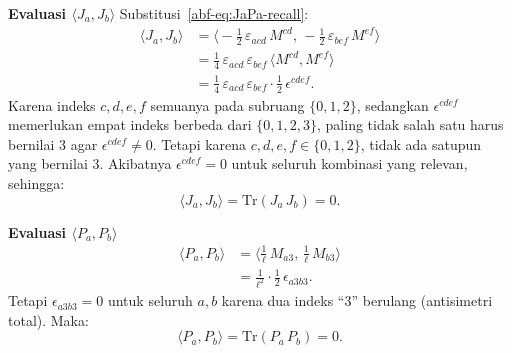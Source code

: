 \vspace{0.5em}
\noindent \textbf{Evaluasi $\langle J_a, J_b\rangle$}
Substitusi~\eqref{abf-eq:JaPa-recall}:
\begin{align}
    \langle J_a, J_b\rangle
    &= \big\langle -\tfrac{1}{2}\,\varepsilon_{acd}\,M^{cd},\, -\tfrac{1}{2}\,\varepsilon_{bef}\,M^{ef}\big\rangle \nonumber\\[4pt]
    &= \tfrac{1}{4}\,\varepsilon_{acd}\,\varepsilon_{bef}\,\langle M^{cd}, M^{ef}\rangle \nonumber\\[4pt]
    &= \tfrac{1}{4}\,\varepsilon_{acd}\,\varepsilon_{bef}\cdot \tfrac{1}{2}\,\epsilon^{cdef}.
\end{align}
Karena indeks $c, d, e, f$ semuanya pada subruang $\{0, 1, 2\}$, sedangkan $\epsilon^{cdef}$ memerlukan empat indeks berbeda dari $\{0, 1, 2, 3\}$, paling tidak salah satu harus bernilai 3 agar $\epsilon^{cdef} \neq 0$. Tetapi karena $c, d, e, f \in \{0, 1, 2\}$, tidak ada satupun yang bernilai 3. Akibatnya $\epsilon^{cdef} = 0$ untuk seluruh kombinasi yang relevan, sehingga:
\begin{equation}\label{abf-eq:JJ-zero}
    \langle J_a, J_b\rangle = \mathrm{Tr}(J_a\,J_b) = 0.
\end{equation}

\vspace{0.5em}
\noindent \textbf{Evaluasi $\langle P_a, P_b\rangle$}
\begin{align}
    \langle P_a, P_b\rangle
    &= \big\langle \tfrac{1}{\ell}\,M_{a3},\, \tfrac{1}{\ell}\,M_{b3}\big\rangle \nonumber\\[4pt]
    &= \tfrac{1}{\ell^2}\cdot \tfrac{1}{2}\,\epsilon_{a3b3}.
\end{align}
Tetapi $\epsilon_{a3b3} = 0$ untuk seluruh $a, b$ karena dua indeks ``3'' berulang (antisimetri total). Maka:
\begin{equation}\label{abf-eq:PP-zero}
    \langle P_a, P_b\rangle = \mathrm{Tr}(P_a\,P_b) = 0.
\end{equation}


